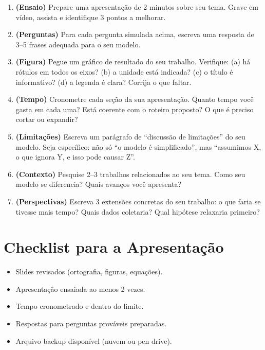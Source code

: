 \documentclass[12pt,a4paper]{article}
\begin{document}
\begin{enumerate}
  \item \textbf{(Ensaio)} Prepare uma apresenta\c{c}\~ao de 2 minutos sobre seu tema. Grave em v\'ideo, assista e identifique 3 pontos a melhorar.
  
  \item \textbf{(Perguntas)} Para cada pergunta simulada acima, escreva uma resposta de 3--5 frases adequada para o seu modelo.
  
  \item \textbf{(Figura)} Pegue um gr\'afico de resultado do seu trabalho. Verifique: (a) h\'a r\'otulos em todos os eixos? (b) a unidade est\'a indicada? (c) o t\'itulo \'e informativo? (d) a legenda \'e clara? Corrija o que faltar.
  
  \item \textbf{(Tempo)} Cronometre cada se\c{c}\~ao da sua apresenta\c{c}\~ao. Quanto tempo voc\^e gasta em cada uma? Est\'a coerente com o roteiro proposto? O que \'e preciso cortar ou expandir?
  
  \item \textbf{(Limita\c{c}\~oes)} Escreva um par\'agrafo de ``discuss\~ao de limita\c{c}\~oes'' do seu modelo. Seja espec\'ifico: n\~ao s\'o ``o modelo \'e simplificado'', mas ``assumimos X, o que ignora Y, e isso pode causar Z''.
  
  \item \textbf{(Contexto)} Pesquise 2--3 trabalhos relacionados ao seu tema. Como seu modelo se diferencia? Quais avanços voc\^e apresenta?
  
  \item \textbf{(Perspectivas)} Escreva 3 extens\~oes concretas do seu trabalho: o que faria se tivesse mais tempo? Quais dados coletaria? Qual hip\'otese relaxaria primeiro?
\end{enumerate}

\section*{Checklist para a Apresenta\c{c}\~ao}
\begin{itemize}
  \item[$\square$] Slides revisados (ortografia, figuras, equa\c{c}\~oes).
  \item[$\square$] Apresenta\c{c}\~ao ensaiada ao menos 2 vezes.
  \item[$\square$] Tempo cronometrado e dentro do limite.
  \item[$\square$] Respostas para perguntas prov\'aveis preparadas.
  \item[$\square$] Arquivo backup dispon\'ivel (nuvem ou pen drive).
\end{itemize}
\end{document}
